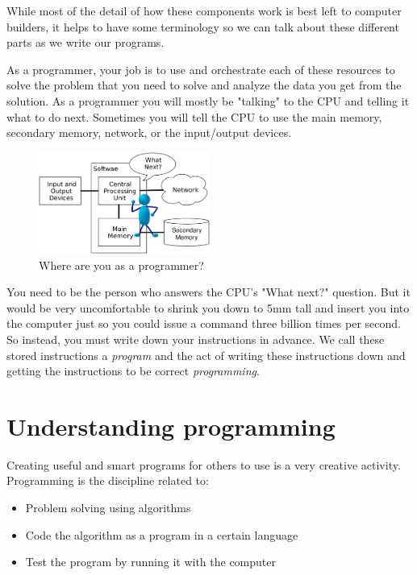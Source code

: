 While most of the detail of how these components work is best left to computer builders, it helps to have some terminology so we can talk about these different parts as we write our programs.

As a programmer, your job is to use and orchestrate each of these resources to solve the problem that you need to solve and analyze the data you get from the solution. As a programmer you will mostly be "talking" to the CPU and telling it what to do next. Sometimes you will tell the CPU to use the main memory, secondary memory, network, or the input/output devices.

\begin{figure}
\centering
\includegraphics[width=0.5\textwidth]{images/comp-hw-arch-2.jpg}
\caption{Where are you as a programmer?}
\label{fig:donde-estas}
\end{figure}

You need to be the person who answers the CPU's "What next?" question. But it would be very uncomfortable to shrink you down to 5mm tall and insert you into the computer just so you could issue a command three billion times per second. So instead, you must write down your instructions in advance. We call these stored instructions a \emph{program} and the act of writing these instructions down and getting the instructions to be correct \emph{programming}.

\hypertarget{programation}{%
\section{Understanding programming}\label{programation}}

Creating useful and smart programs for others to use is a very creative activity. Programming is the discipline related to:

\begin{itemize}[nosep]
\item
  Problem solving using algorithms
\item
  Code the algorithm as a program in a certain language
\item
  Test the program by running it with the computer
\end{itemize}

